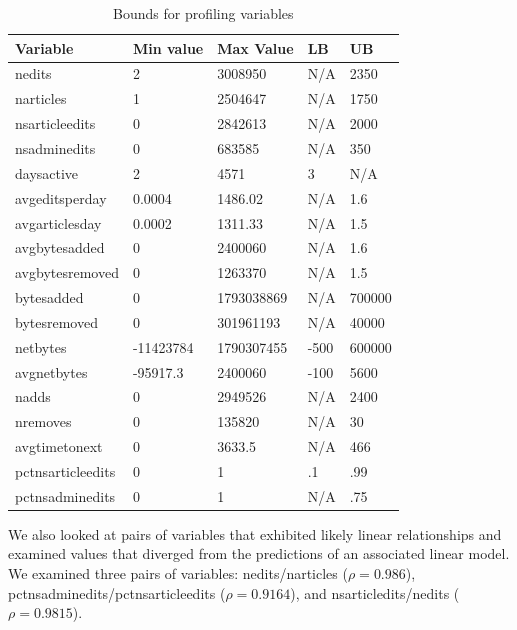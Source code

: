 \documentclass{article}
\begin{document}
\begin{table}
\begin{tabular}{l|l|l|l|l}
Variable & Min value & Max Value & LB & UB\\
\hline
nedits            & 2 & 3008950 & N/A & 2350 \\
narticles         & 1 & 2504647 & N/A & 1750\\
nsarticleedits    & 0 & 2842613 & N/A & 2000\\
nsadminedits      & 0 & 683585 & N/A & 350\\
daysactive        & 2 & 4571 & 3 & N/A\\
avgeditsperday    & 0.0004 & 1486.02 & N/A & 1.6 \\
avgarticlesday    & 0.0002 & 1311.33 & N/A & 1.5 \\
avgbytesadded     & 0 & 2400060 & N/A & 1.6 \\
avgbytesremoved   & 0 & 1263370 & N/A & 1.5 \\
bytesadded        & 0 & 1793038869 & N/A & 700000\\
bytesremoved      & 0 & 301961193 & N/A & 40000\\
netbytes          & -11423784 & 1790307455 & -500 & 600000\\
avgnetbytes       & -95917.3 & 2400060 & -100 & 5600\\
nadds             & 0 & 2949526 & N/A & 2400\\
nremoves          & 0 & 135820 & N/A & 30\\
avgtimetonext     & 0 & 3633.5 & N/A & 466\\
pctnsarticleedits & 0 & 1 & .1 & .99\\
pctnsadminedits   & 0 & 1 & N/A & .75\\
\end{tabular}
\caption{Bounds for profiling variables}
\label{bounds}
\end{table}

We also looked at pairs of variables that exhibited likely linear relationships and examined values that diverged from the predictions of an associated linear model. We examined three pairs of variables: nedits/narticles ($\rho = 0.986$), pctnsadminedits/pctnsarticleedits ($\rho = 0.9164$), and  nsarticledits/nedits ($\rho = 0.9815$).
\end{document}
